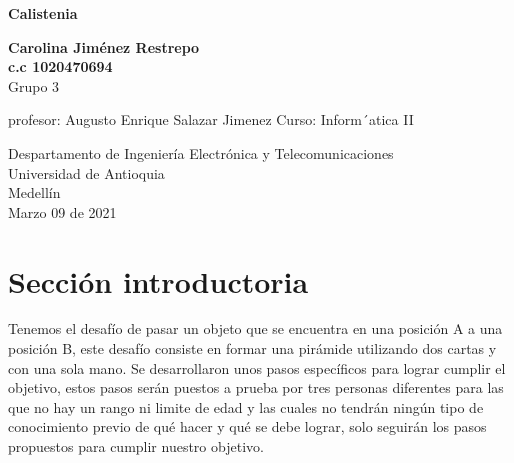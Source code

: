 \documentclass{article}
\begin{document}
\begin{titlepage}
    \begin{center}
        \vspace*{1cm}
            
        \Huge
        \textbf{Calistenia}
            
        \vspace{0.5cm}
        \LARGE
        
            
        \vspace{1.5cm}
            
        \textbf{Carolina Jiménez Restrepo}\\
        \textbf{c.c 1020470694}
          \\  Grupo 3
         
         \vspace{2.9cm}
         
          profesor: Augusto Enrique Salazar Jimenez
          Curso: Inform´atica II


        \vfill
            
        \vspace{0.8cm}
            
        \Large
        Despartamento de Ingeniería Electrónica y Telecomunicaciones\\
        Universidad de Antioquia\\
        Medellín\\
        Marzo 09 de 2021
            
    \end{center}
\end{titlepage}

\tableofcontents
\newpage
\section{Sección introductoria}\label{intro}
Tenemos el desafío de pasar un objeto que se encuentra en una posición A a una posición B, este desafío consiste en formar una pirámide utilizando dos cartas y con una sola mano. Se desarrollaron unos pasos específicos para lograr cumplir el objetivo, estos pasos serán puestos a prueba por tres personas diferentes para las que no hay un rango ni limite de edad y las cuales no tendrán ningún tipo de conocimiento previo de qué hacer y qué se debe lograr, solo seguirán los pasos propuestos para cumplir nuestro objetivo.
\end{document}
